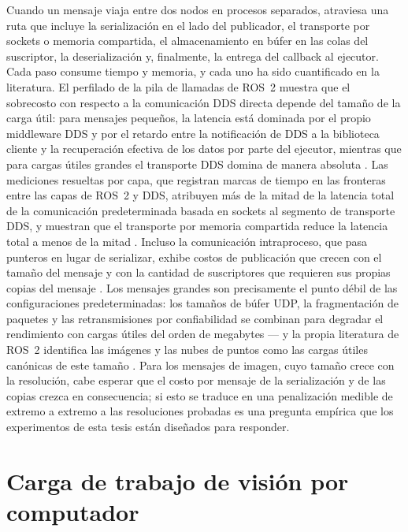 Cuando un mensaje viaja entre dos nodos en procesos separados, atraviesa una
ruta que incluye la serialización en el lado del publicador, el transporte
por sockets o memoria compartida, el almacenamiento en búfer en las colas del
suscriptor, la deserialización y, finalmente, la entrega del callback al
ejecutor. Cada paso consume tiempo y memoria, y cada uno ha sido cuantificado
en la literatura. El perfilado de la pila de llamadas de ROS~2 muestra que
el sobrecosto con respecto a la comunicación DDS directa depende del tamaño
de la carga útil: para mensajes pequeños, la latencia está dominada por el
propio middleware DDS y por el retardo entre la notificación de DDS a la
biblioteca cliente y la recuperación efectiva de los datos por parte del
ejecutor, mientras que para cargas útiles grandes el transporte DDS domina
de manera absoluta \cite{kronauer2021}. Las mediciones resueltas por capa,
que registran marcas de tiempo en las fronteras entre las capas de ROS~2 y
DDS, atribuyen más de la mitad de la latencia total de la comunicación
predeterminada basada en sockets al segmento de transporte DDS, y muestran
que el transporte por memoria compartida reduce la latencia total a menos
de la mitad \cite{kamiya2025}. Incluso la comunicación intraproceso, que
pasa punteros en lugar de serializar, exhibe costos de publicación que crecen
con el tamaño del mensaje y con la cantidad de suscriptores que requieren
sus propias copias del mensaje \cite{luo2025}. Los mensajes grandes son
precisamente el punto débil de las configuraciones predeterminadas: los
tamaños de búfer UDP, la fragmentación de paquetes y las retransmisiones por
confiabilidad se combinan para degradar el rendimiento con cargas útiles del
orden de megabytes \cite{macenski2022, kronauer2021}--- y la propia
literatura de ROS~2 identifica las imágenes y las nubes de puntos como las
cargas útiles canónicas de este tamaño \cite{macenski2022, macenski2023}. Para los mensajes de imagen, cuyo
tamaño crece con la resolución, cabe esperar que el costo por mensaje de la
serialización y de las copias crezca en consecuencia; si esto se traduce en
una penalización medible de extremo a extremo a las resoluciones probadas es
una pregunta empírica que los experimentos de esta tesis están diseñados
para responder.

\section{Carga de trabajo de visión por computador}
\label{sec:workload}

